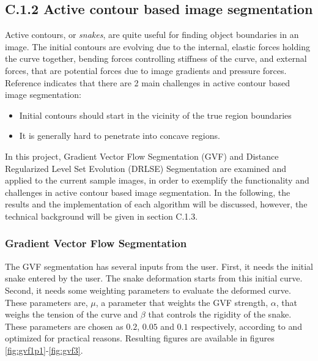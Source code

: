 \documentclass{article}
\begin{document}
\subsection*{C.1.2 Active contour based image segmentation}
Active contours, or \emph{snakes}, are quite useful for finding object boundaries in an image. The initial contours are evolving due to the internal, elastic forces holding the curve together, bending forces controlling stiffness of the curve, and external forces, that are potential forces due to image gradients and pressure forces. Reference \cite{gvf} indicates that there are 2 main challenges in active contour based image segmentation:
\begin{itemize}
\item Initial contours should start in the vicinity of the true region boundaries
\item It is generally hard to penetrate into concave regions.
\end{itemize}
In this project, Gradient Vector Flow Segmentation (GVF) \cite{gvf} and Distance Regularized Level Set Evolution (DRLSE) Segmentation \cite{drlse} are examined and applied to the current sample images, in order to exemplify the functionality and challenges in active contour based image segmentation. In the following, the results and the implementation of each algorithm will be discussed, however, the technical background will be given in section C.1.3. 


\subsubsection*{Gradient Vector Flow Segmentation}
The GVF segmentation has several inputs from the user. First, it needs the initial snake entered by the user. The snake deformation starts from this initial curve. Second, it needs some weighting parameters to evaluate the deformed curve. These parameters are, $\mu$, a parameter that weights the GVF strength, $\alpha$, that weighs the tension of the curve and $\beta$ that controls the rigidity of the snake. These parameters are chosen as $0.2$, $0.05$ and $0.1$ respectively, according to \cite{gvf} and optimized for practical reasons. Resulting figures are available in figures \ref{fig:gvf1p1}-\ref{fig:gvf3}.
\end{document}

